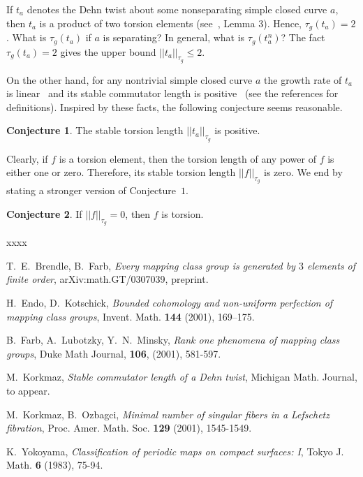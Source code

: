 \documentclass[11pt]{amsart}
\theoremstyle{definition}
\newtheorem{conj}{Conjecture}
\theoremstyle{remark}
\begin{document}
If $t_a$ denotes the Dehn twist about some nonseparating
simple closed curve $a$, then $t_a$ is a product of two torsion elements 
(see~\cite{bf}, Lemma $3$). Hence, $\tau_g(t_a)=2$. What is $\tau_g(t_a)$ if $a$
is separating? In general, what is $\tau_g(t_a^n)$? The fact
$\tau_g(t_a)=2$ gives the upper bound $||t_a||_{\tau_g}\leq 2$.

On the other hand, for any nontrivial simple closed curve $a$ 
the growth rate of $t_a$ is linear~\cite{k,flm}
and its stable commutator length is positive~\cite{k,ek} (see the references for 
definitions).  Inspired by these facts, the following conjecture seems reasonable.

\begin{conj}
The stable torsion length $||t_a||_{\tau_g}$ is positive.
\end{conj}

Clearly, if $f$ is a torsion element, then the torsion length of any power of $f$ is 
either one or zero. Therefore, its stable torsion length $||f||_{\tau_g}$ is zero. We end
by stating a stronger version of Conjecture~$1$.

\begin{conj}
If $||f||_{\tau_g}=0$, then $f$ is torsion. 
\end{conj}



\begin{thebibliography}{xxxx}


 T.~E.~Brendle, B.~Farb,
 {\em Every mapping class group is generated by $3$ elements of finite order}, 
arXiv:math.GT/0307039, preprint.

H.~Endo, D.~Kotschick,
 {\em Bounded cohomology and non-uniform perfection of mapping class groups},
 Invent. Math. {\bf144} (2001), 169--175.

 B.~Farb, A.~Lubotzky, Y.~N.~Minsky,
 {\em Rank one phenomena of mapping class groups},
 Duke Math Journal, {\bf106}, (2001), 581-597.

 M.~Korkmaz,
 {\em Stable commutator length of a Dehn twist}, 
Michigan Math. Journal, to appear.

 M.~Korkmaz, B.~Ozbagci,
 {\em Minimal number of singular fibers in a Lefschetz fibration},
 Proc. Amer. Math. Soc. {\bf129}  (2001), 1545-1549.

 K.~Yokoyama,
 {\em Classification of periodic maps on compact surfaces: I}, 
Tokyo J. Math. {\bf6} (1983), 75-94.

\end{thebibliography}
\end{document}
